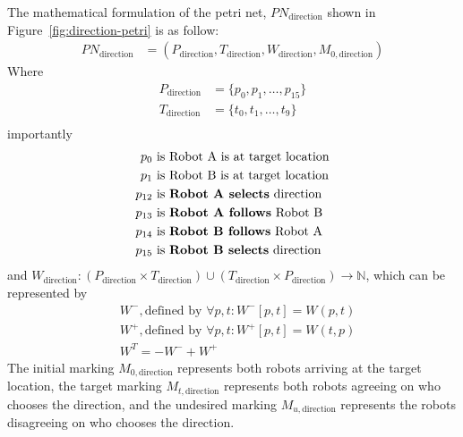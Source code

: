 \documentclass[12pt,a4paper]{article}
\begin{document}
The mathematical formulation of the petri net, $PN_{\text{direction}}$ shown in Figure~\ref{fig:direction-petri} is as follow:
\begin{align*}
    PN_{\text{direction}} &= (P_{\text{direction}}, T_{\text{direction}}, W_{\text{direction}}, M_{0, \text{direction}})
\end{align*}
Where
\begin{align*}
    P_{\text{direction}} &= \{p_0, p_1, \ldots, p_{15}\} \\
    T_{\text{direction}} &= \{t_0, t_1, \ldots, t_{9}\} \\
\end{align*}
importantly
\begin{align*}
    p_0 &\text{ is Robot A is at target location} \\
    p_1 &\text{ is Robot B is at target location} \\
    p_{12} &\text{ is \textbf{Robot A selects} direction} \\
    p_{13} &\text{ is \textbf{Robot A follows} Robot B} \\
    p_{14} &\text{ is \textbf{Robot B follows} Robot A} \\
    p_{15} &\text{ is \textbf{Robot B selects} direction} \\
\end{align*}
and ${\displaystyle W_{\text{direction}}:(P_{\text{direction}}\times T_{\text{direction}})\cup (T_{\text{direction}}\times P_{\text{direction}})\to \mathbb {N} }$, which can be represented by
\begin{align*}
    &W^{-}, \text{defined by } \forall p,t : W^{-}[p,t] = W(p, t) \\
    &W^{+}, \text{defined by } \forall p,t : W^{+}[p,t] = W(t, p) \\
    &W^{T} = -W^{-} + W^{+}
\end{align*}
The initial marking $M_{0, \text{direction}}$ represents both robots arriving at the target location, the target marking $M_{t, \text{direction}}$ represents both robots agreeing on who chooses the direction, and the undesired marking $M_{u, \text{direction}}$ represents the robots disagreeing on who chooses the direction.
\end{document}
